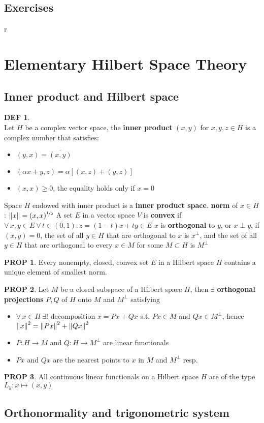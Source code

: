 \documentclass[hidelinks,10pt]{article}
\theoremstyle{definition}
\newtheorem*{defin}{DEF}
\theoremstyle{dotles}
\newenvironment{exercise}[1]
  {\renewcommand\theinnercustomex{#1}\innercustomex}
  {\endinnercustomex}
\theoremstyle{dotless}
\newtheorem{proposition}{PROP}[section]
\theoremstyle{remark}
\begin{document}
\subsection*{Exercises}

\begin{exercise}{3.1}
r
\end{exercise}

\newpage

\section{Elementary Hilbert Space Theory}

\subsection{Inner product and Hilbert space}

\begin{defin}~\\
Let $H$ be a complex vector space, the \textbf{inner product} $(x,y)$ for $x,y,z\in H$ is a complex number that satisfies:\begin{itemize}
    \item $(y,x)=\overline{(x,y)}$
    \item $(\alpha x+y,z)=\alpha[(x,z)+(y,z)]$
    \item $(x,x)\geq0$, the equality holds only if $x=0$
\end{itemize}
Space $H$ endowed with inner product is a \textbf{inner product space}.\bigbreak
\textbf{norm} of $x\in H$: $\norm{x}=(x,x)^{\nicefrac{1}{2}}$\bigbreak
A set $E$ in a vector space $V$ is \textbf{convex} if $\forall\,x,y\in E\ \forall\,t\in(0,1):z=(1-t)x+ty\in E$\newline
$x$ is \textbf{orthogonal} to $y$, or $x\perp y$, if $(x,y)=0$, the set of all $y\in H$ that are orthogonal to $x$ is $x^\perp$, and the set of all $y\in H$ that are orthogonal to every $x\in M$ for some $M\subset H$ is $M^\perp$
\end{defin}

\begin{proposition}
Every nonempty, closed, convex set $E$ in a Hilbert space $H$ contains a unique element of smallest norm. 
\end{proposition}

\begin{proposition}
Let $M$ be a closed subspace of a Hilbert space $H$, then $\exists$ \textbf{orthogonal projections} $P,Q$ of $H$ onto $M$ and $M^\perp$ satisfying\begin{itemize}
    \item $\forall\,x\in H\ \exists!$ decomposition $x=Px+Qx$ s.t. $Px\in M$ and $Qx\in M^\perp$, hence $\norm{x}^2=\norm{Px}^2+\norm{Qx}^2$
    \item $P:H\to M$ and $Q:H\to M^\perp$ are linear functionals
    \item $Px$ and $Qx$ are the nearest points to $x$ in $M$ and $M^\perp$ resp.
\end{itemize}
\end{proposition}

\begin{proposition}
All continuous linear functionals on a Hilbert space $H$ are of the type $L_y:x\mapsto(x,y)$
\end{proposition}

\subsection{Orthonormality and trigonometric system}
\end{document}
